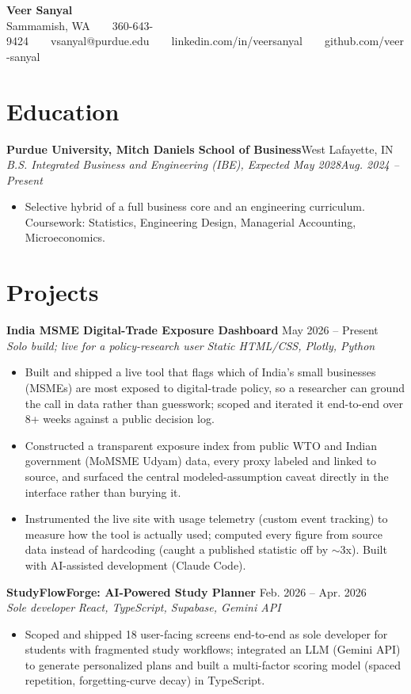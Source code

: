 \documentclass[10pt,letterpaper]{article}
\newcommand{\entry}[4]{%
  \textbf{#1}\hfill #2\\[1pt]
  \textit{#3}\hfill \textit{#4}\\[1pt]
}
\begin{document}
\begin{center}
{\LARGE \textbf{Veer Sanyal}}\\[3pt]
{\small Sammamish, WA~~\textbar~~360-643-9424~~\textbar~~vsanyal@purdue.edu~~\textbar~~linkedin.com/in/veersanyal~~\textbar~~github.com/veer-sanyal}
\end{center}

\section{Education}
\entry{Purdue University, Mitch Daniels School of Business}{West Lafayette, IN}{B.S. Integrated Business and Engineering (IBE), Expected May 2028}{Aug. 2024 -- Present}
\begin{itemize}
  \item Selective hybrid of a full business core and an engineering curriculum. Coursework: Statistics, Engineering Design, Managerial Accounting, Microeconomics.
\end{itemize}

\section{Projects}
\textbf{India MSME Digital-Trade Exposure Dashboard} \hfill May 2026 -- Present\\
\textit{Solo build; live for a policy-research user} \hfill \textit{Static HTML/CSS, Plotly, Python}\\[2pt]
\begin{itemize}
  \item Built and shipped a live tool that flags which of India's small businesses (MSMEs) are most exposed to digital-trade policy, so a researcher can ground the call in data rather than guesswork; scoped and iterated it end-to-end over 8+ weeks against a public decision log.
  \item Constructed a transparent exposure index from public WTO and Indian government (MoMSME Udyam) data, every proxy labeled and linked to source, and surfaced the central modeled-assumption caveat directly in the interface rather than burying it.
  \item Instrumented the live site with usage telemetry (custom event tracking) to measure how the tool is actually used; computed every figure from source data instead of hardcoding (caught a published statistic off by $\sim$3x). Built with AI-assisted development (Claude Code).
\end{itemize}
\vspace{2pt}
\textbf{StudyFlowForge: AI-Powered Study Planner} \hfill Feb. 2026 -- Apr. 2026\\
\textit{Sole developer} \hfill \textit{React, TypeScript, Supabase, Gemini API}\\[2pt]
\begin{itemize}
  \item Scoped and shipped 18 user-facing screens end-to-end as sole developer for students with fragmented study workflows; integrated an LLM (Gemini API) to generate personalized plans and built a multi-factor scoring model (spaced repetition, forgetting-curve decay) in TypeScript.
\end{itemize}
\end{document}
